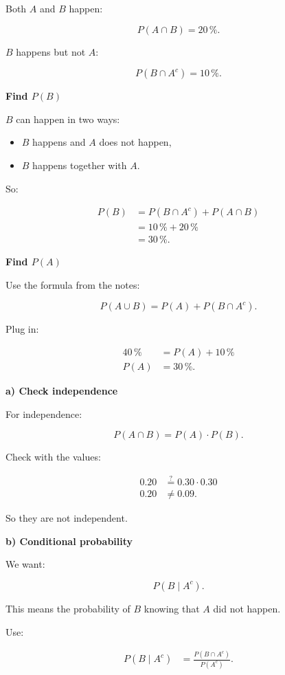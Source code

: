 \documentclass[10pt]{article}
\begin{document}
Both $A$ and $B$ happen:

\[
P(A\cap B)=20\,\%.
\]

$B$ happens but not $A$:

\[
P(B\cap A^c)=10\,\%.
\]

\textbf{Find $P(B)$}

$B$ can happen in two ways:

\begin{itemize}
\item $B$ happens and $A$ does not happen,
\item $B$ happens together with $A$.
\end{itemize}

So:

\begin{align*}
P(B)
&=
P(B\cap A^c)
+P(A\cap B) \\[2mm]
&=
10\,\%+20\,\% \\[2mm]
&=30\,\%.
\end{align*}

\textbf{Find $P(A)$}

Use the formula from the notes:

\[
P(A\cup B)=P(A)+P(B\cap A^c).
\]

Plug in:

\begin{align*}
40\,\%
&=
P(A)+10\,\% \\[2mm]
P(A)
&=
30\,\%.
\end{align*}

\textbf{a) Check independence}

For independence:

\[
P(A\cap B)=P(A)\cdot P(B).
\]

Check with the values:

\begin{align*}
0.20
&\stackrel{?}{=}
0.30\cdot 0.30 \\[2mm]
0.20
&\neq 0.09.
\end{align*}

So they are not independent.

\textbf{b) Conditional probability}

We want:

\[
P(B\mid A^c).
\]

This means the probability of $B$ knowing that $A$ did not happen.

Use:

\begin{align*}
P(B\mid A^c)
&=
\frac{P(B\cap A^c)}{P(A^c)}.
\end{align*}
\end{document}
